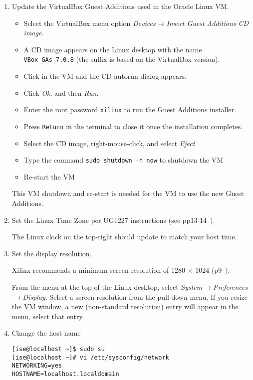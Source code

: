 \begin{enumerate}
\begin{enumerate}
\item Update the VirtualBox Guest Additions used in the Oracle Linux VM.
\begin{itemize}
\item Select the VirtualBox menu option \emph{Devices$\rightarrow$Insert 
Guest Additions CD image}.
\item A CD image appears on the Linux desktop with the name \verb+VBox_GAs_7.0.8+\newline
(the suffix is based on the VirtualBox version). 
\item Click in the VM and the CD autorun dialog appears.
\item Click \emph{Ok}, and then \emph{Run}.
\item Enter the root password \verb+xilinx+ to run the Guest Additions installer.
\item Press \verb+Return+ in the terminal to close it once
the installation completes.
\item Select the CD image, right-mouse-click, and select \emph{Eject}.
\item Type the command \verb+sudo shutdown -h now+ to shutdown the VM
\item Re-start the VM
\end{itemize}
%
This VM shutdown and re-start is needed for the VM to use the new Guest Additions.

\item Set the Linux Time Zone per UG1227 instructions (see pp13-14~\cite{Xilinx_UG1227_2020}).

The Linux clock on the top-right should update to match your host time.

\item Set the display resolution.

Xilinx recommends a minimum screen resolution of 1280 $\times$ 1024 (p9~\cite{Xilinx_UG1227_2020}).

From the menu at the top of the Linux desktop, select \emph{System$\rightarrow$Preferences$\rightarrow$Display}. Select a screen resolution from the pull-down menu. If you resize the VM window,
a new (non-standard resolution) entry will appear in the menu, select that entry.

\newpage
\item Change the host name


\begin{verbatim}
[ise@localhost ~]$ sudo su
[ise@localhost ~]# vi /etc/sysconfig/network
NETWORKING=yes
HOSTNAME=localhost.localdomain


\end{verbatim}
\end{enumerate}
\end{enumerate}
